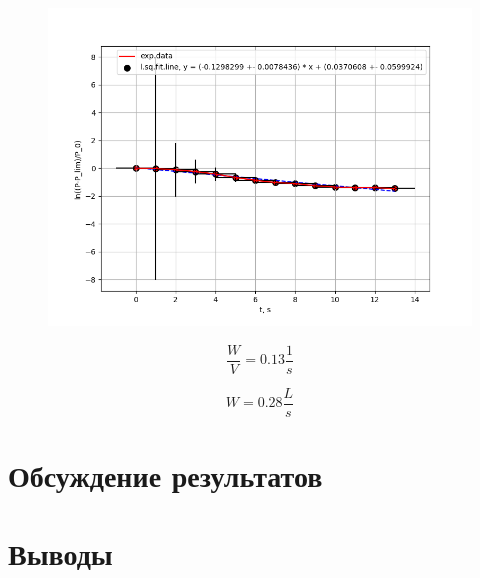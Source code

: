 \documentclass[a4paper,12pt]{article} %
\begin{document}
\begin{figure}[H]
\begin{floatrow}
         {\includegraphics[scale=0.75]{physlabwork_15week_dlogPdt.png}}     
\end{floatrow}
\end{figure}

\begin{equation*}
    \frac{W}{V} = 0.13 \frac{1}{s}
\end{equation*}

\begin{equation*}
    W = 0.28 \frac{L}{s}
\end{equation*}

\section{Обсуждение результатов}

\section{Выводы}
\end{document}
